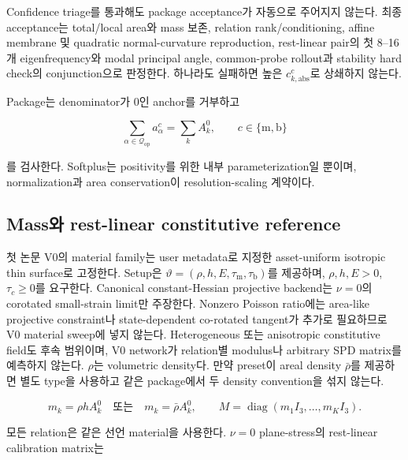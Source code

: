 \documentclass[11pt,a4paper]{article}
\newcommand{\diag}{\operatorname{diag}}
\begin{document}
Confidence triage를 통과해도 package acceptance가 자동으로 주어지지 않는다.
최종 acceptance는 total/local area와 mass 보존, relation rank/conditioning,
affine membrane 및 quadratic normal-curvature reproduction, rest-linear pair의 첫 8--16개
eigenfrequency와 modal principal angle, common-probe rollout과 stability hard check의
conjunction으로 판정한다. 하나라도 실패하면 높은 \(c_{k,\mathrm{abs}}^c\)로 상쇄하지 않는다.

Package는 denominator가 0인 anchor를 거부하고

\begin{equation}
  \sum_{\alpha\in\mathcal Q_{\mathrm{op}}}a_\alpha^c
  =\sum_kA_k^0,
  \qquad
  c\in\{\mathrm m,\mathrm b\}
\end{equation}

를 검사한다.
Softplus는 positivity를 위한 내부 parameterization일 뿐이며,
normalization과 area conservation이 resolution-scaling 계약이다.

\subsection{Mass와 rest-linear constitutive reference}

첫 논문 V0의 material family는 user metadata로 지정한
asset-uniform isotropic thin surface로 고정한다.
Setup은 \(\vartheta=(\rho,h,E,\tau_{\mathrm m},\tau_{\mathrm b})\)를 제공하며,
\(\rho,h,E>0\), \(\tau_c\ge0\)를 요구한다.
Canonical constant-Hessian projective backend는 \(\nu=0\)의 corotated
small-strain limit만 주장한다. Nonzero Poisson ratio에는 area-like projective constraint나
state-dependent co-rotated tangent가 추가로 필요하므로 V0 material sweep에 넣지 않는다.
Heterogeneous 또는 anisotropic constitutive field도 후속 범위이며,
V0 network가 relation별 modulus나 arbitrary SPD matrix를 예측하지 않는다.
\(\rho\)는 volumetric density다.
만약 preset이 areal density \(\bar\rho\)를 제공하면 별도 type을 사용하고
같은 package에서 두 density convention을 섞지 않는다.

\begin{equation}
  m_k=\rho hA_k^0
  \quad\text{또는}\quad
  m_k=\bar\rho A_k^0,
  \qquad
  M=\diag(m_1I_3,\ldots,m_KI_3).
  \label{eq:exact-anchor-mass}
\end{equation}

모든 relation은 같은 선언 material을 사용한다. \(\nu=0\) plane-stress의
rest-linear calibration matrix는
\end{document}
